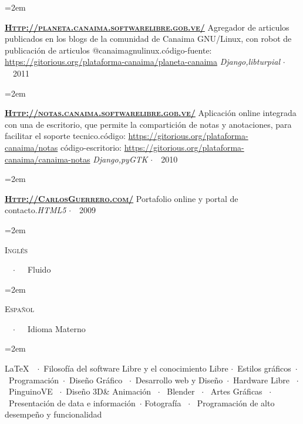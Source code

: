 \documentclass{scrartcl}	%
\newcommand{\MarginDate}[1]{\marginpar{\raggedleft\itshape\small#1}}
\newcommand{\Description}[1]{\hangindent=2em\hangafter=0\noindent\raggedright\footnotesize{#1}\par\normalsize}
\begin{document}
\begin{cv}{}
\Description{\textsc{\href{Http://planeta.canaima.softwarelibre.gob.ve/}{\textbf{Http://planeta.canaima.softwarelibre.gob.ve/}}} \newline Agregador de articulos publicados en los blogs de la comunidad de Canaima GNU/Linux, con robot de publicación de articulos @canaimagnulinux.\newline código-fuente: \href{https://gitorious.org/plataforma-canaima/planeta-canaima}{https://gitorious.org/plataforma-canaima/planeta-canaima} \newline \textit{Django,libturpial} $\cdotp$\ \ 2011\newline}

\Description{\textsc{\href{Http://notas.canaima.softwarelibre.gob.ve/}{\textbf{Http://notas.canaima.softwarelibre.gob.ve/}}} \newline Aplicación online integrada con una de escritorio, que permite la compartición de notas y anotaciones, para facilitar el soporte tecnico.\newline código: \href{https://gitorious.org/plataforma-canaima/notas}{https://gitorious.org/plataforma-canaima/notas}  \newline código-escritorio: \href{https://gitorious.org/plataforma-canaima/canaima-notas}{https://gitorious.org/plataforma-canaima/canaima-notas} \newline \textit{Django,pyGTK} $\cdotp$\ \ 2010\newline}

\Description{\textsc{\href{Http://CarlosGuerrero.com/}{\textbf{Http://CarlosGuerrero.com/}}} \newline Portafolio online y portal de contacto.\newline \textit{HTML5} $\cdotp$\ \ 2009\newline}

\newlength{\langbox}
\settowidth{\langbox}{English}


\Description{\parbox{\langbox}{\textsc{Inglés}}\ \ $\cdotp$\ \  \ Fluido}
\MarginDate{Idiomas}
\vspace{0.5em}

\Description{\parbox{\langbox}{\textsc{Español}}\ \ $\cdotp$\ \ \  Idioma Materno}
\vspace{1em}

\Description{\LaTeX\ \MarginDate{Intereses}\  $\cdotp$\ Filosofía del software Libre y el conocimiento Libre $\cdotp$\ Estilos gráficos\ $\cdotp$\ Programación\ $\cdotp$\ Diseño Gráfico \ $\cdotp$\ Desarrollo web y Diseño\ $\cdotp$\ Hardware Libre \ $\cdotp$\ PinguinoVE \ $\cdotp$\ Diseño 3D\& Animación \ $\cdotp$ \ Blender  \ $\cdotp$ \ Artes Gráficas \ $\cdotp$ \ Presentación de data e información\ $\cdotp$ Fotografía \ $\cdotp$ \ Programación de alto desempeño y funcionalidad}
\enlargethispage{\baselineskip}
\end{cv}
\end{document}
